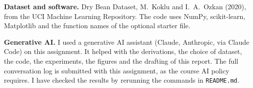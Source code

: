 \textbf{Dataset and software.} Dry Bean Dataset, M.~Koklu and I.~A.~Ozkan (2020), from
the UCI Machine Learning Repository. The code uses NumPy, scikit-learn, Matplotlib and
the function names of the optional starter file.

\textbf{Generative AI.} I used a generative AI assistant (Claude, Anthropic, via
Claude Code) on this assignment. It helped with the derivations, the choice of dataset,
the code, the experiments, the figures and the drafting of this report. The full
conversation log is submitted with this assignment, as the course AI policy requires. I
have checked the results by rerunning the commands in \texttt{README.md}.
